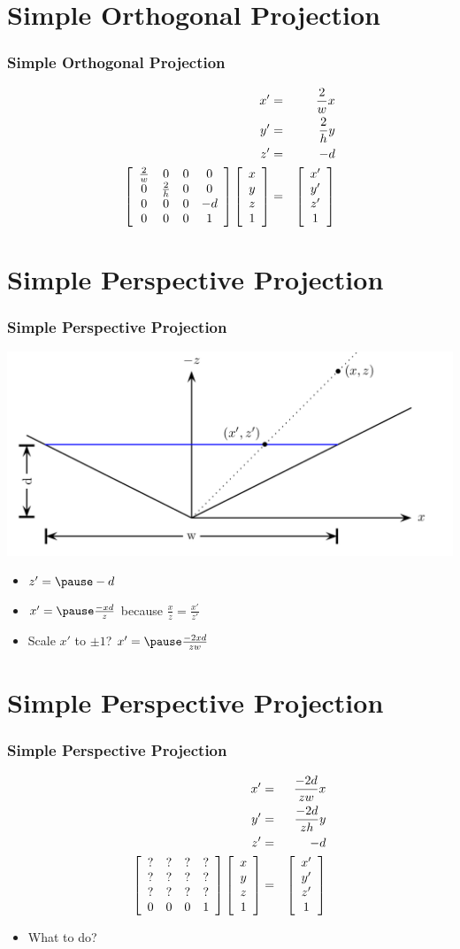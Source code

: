 \documentclass[slidestop,xcolor=pst]{beamer}
\newcommand{\sect}[1]{
\section{#1}
\begin{frame}[fragile]\frametitle{#1}
}
\begin{document}
\sect{Simple Orthogonal Projection}
\begin{eqnarray*}
x' &=& \frac{2}{w}x\\
y' &=& \frac{2}{h}y\\
z' &=& -d\\
\left[\begin{array}{cccc} \frac{2}{w}&0&0&0 \\ 0&\frac{2}{h}&0&0 \\ 0&0&0&-d \\0&0&0&1\end{array}\right] \left[\begin{array}{c} x\\y\\z \\ 1\end{array}\right]&=&\left[\begin{array}{c} x'\\y'\\z' \\ 1\end{array}\right]
\end{eqnarray*}
\end{frame}

\sect{Simple Perspective Projection}
\includegraphics[width=\textwidth]{perspective.png}
\begin{itemize}
\item $z' = \pause -d$
\item $x' = \pause \frac{-xd}{z}$ because $\frac{x}{z} = \frac{x'}{z'}$
\item Scale $x'$ to $\pm 1$? $x' = \pause \frac{-2xd}{zw}$
\end{itemize}
\end{frame}

\sect{Simple Perspective Projection}
\begin{eqnarray*}
x' &=&  \frac{-2d}{zw}x\\
y' &=& \frac{-2d}{zh}y\\
z' &=&  -d\\
\left[\begin{array}{cccc} ?&?&?&? \\ ?&?&?&? \\ ?&?&?&? \\0&0&0&1\end{array}\right] \left[\begin{array}{c} x\\y\\z \\ 1\end{array}\right]&=&\left[\begin{array}{c} x'\\y'\\z' \\ 1\end{array}\right]
\end{eqnarray*}
\begin{itemize}
\item What to do?
\end{itemize}
\end{frame}
\end{document}

